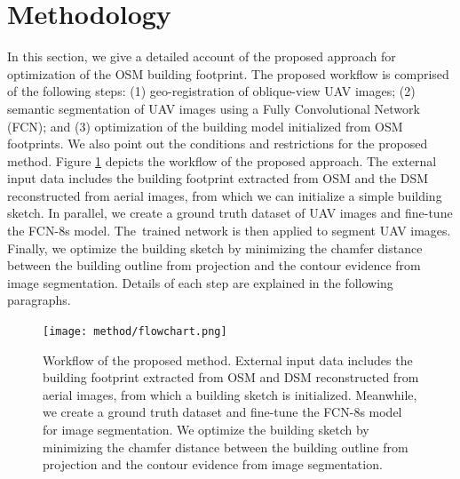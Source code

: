 \documentclass[remotesensing,article,accept,moreauthors,pdftex,10pt,a4paper]{mdpi}
\theoremstyle{mdpi}
\newcounter{ex}
\newcounter{re}
\begin{document}

\section{Methodology}\label{sec:method}
In this section, we give a detailed account of the proposed approach for optimization of the OSM building footprint. The proposed workflow is comprised of the following steps: (1) geo-registration of oblique-view UAV images; (2) semantic segmentation of UAV images using a Fully Convolutional Network (FCN); and (3) optimization of the building model initialized from OSM footprints. We also point out the conditions and restrictions for the proposed method. Figure \ref{fig:flow} depicts the workflow of the proposed approach. The external input data includes the building footprint extracted from OSM and the DSM reconstructed from aerial images, from which we can initialize a simple building sketch. In parallel, we create a ground truth dataset of UAV images and fine-tune the FCN-8s model. The~trained network is then applied to segment UAV images. Finally, we optimize the building sketch by minimizing the chamfer distance between the building outline from projection and the contour evidence from image segmentation. Details of each step are explained in the following paragraphs. 

\begin{figure}[H]
    \centering       
           \centering
           \texttt{[image: method/flowchart.png]} 
       \caption{Workflow of the proposed method. External input data includes the building footprint extracted from OSM and DSM 
reconstructed from aerial images, from which a building sketch is initialized. Meanwhile, we create a ground truth dataset and fine-tune the FCN-8s 
model for image segmentation. We optimize the building sketch by minimizing the chamfer distance between the building outline from projection and the contour evidence from image segmentation.}
       \label{fig:flow}
\end{figure}
\end{document}
